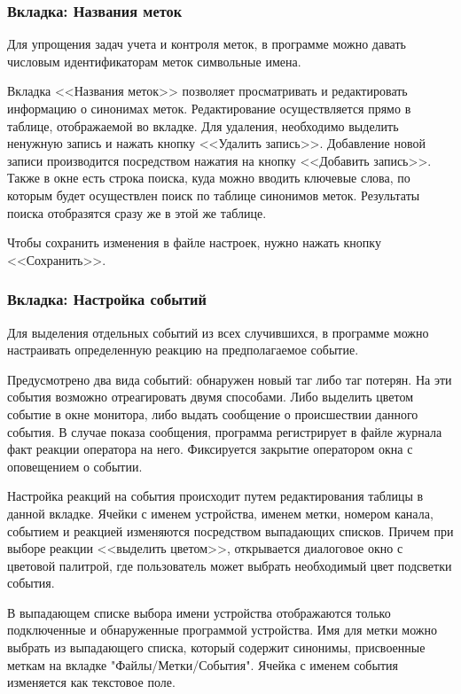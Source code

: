 \subsubsection{Вкладка: Названия меток}

Для упрощения задач учета и контроля меток, в программе можно давать числовым идентификаторам меток
символьные имена. 

Вкладка <<Названия меток>> позволяет просматривать и редактировать информацию о синонимах меток. 
Редактирование осуществляется прямо в таблице, отображаемой во вкладке. Для удаления, необходимо выделить ненужную 
запись и нажать кнопку <<Удалить запись>>. Добавление новой записи производится посредством нажатия на
кнопку <<Добавить запись>>. Также в окне есть строка поиска, куда можно вводить ключевые слова, по которым
будет осуществлен поиск по таблице синонимов меток. Результаты поиска отобразятся сразу же в этой же таблице.

Чтобы сохранить изменения в файле настроек, нужно нажать кнопку <<Сохранить>>.

\subsubsection{Вкладка: Настройка событий}

Для выделения отдельных событий из всех случившихся, в программе можно настраивать определенную реакцию
на предполагаемое событие. 

Предусмотрено два вида событий: обнаружен новый таг либо таг потерян. На эти события возможно отреагировать двумя способами.
Либо выделить цветом событие в окне монитора, либо выдать сообщение о происшествии данного события.
В случае показа сообщения, программа регистрирует в файле журнала факт реакции оператора на него. Фиксируется закрытие
оператором окна с оповещением о событии.

Настройка реакций на события происходит путем редактирования таблицы в данной вкладке. Ячейки с именем устройства, именем метки, 
номером канала, событием и реакцией
изменяются посредством выпадающих списков. Причем при выборе реакции <<выделить цветом>>, открывается диалоговое окно с цветовой палитрой, где
пользователь может выбрать необходимый цвет подсветки события. 

В выпадающем списке выбора имени устройства отображаются только подключенные и обнаруженные программой устройства. Имя для метки можно выбрать из
выпадающего списка, который содержит синонимы, присвоенные меткам на вкладке "Файлы/Метки/События".
Ячейка с именем события изменяется как текстовое поле. 

